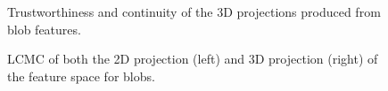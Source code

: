 \begin{figure}[H]
	\centering
	\caption{Trustworthiness and continuity of the 3D projections produced from blob features.}\label{fig:TC_3d_blobs}
\end{figure}

\begin{figure}[H]
	\centering
	\caption{LCMC of both the 2D projection (left) and 3D projection (right) of the feature space for blobs.}\label{fig:LCMC_blobs}
\end{figure}
\clearpage

